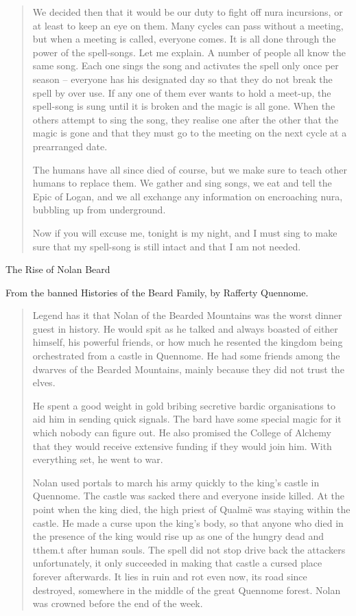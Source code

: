 \begin{multicols}{2}
\begin{quotation}
	We decided then that it would be our duty to fight off nura incursions, or at least to keep an eye on them.  Many cycles can pass without a meeting, but when a meeting is called, everyone comes.  It is all done through the power of the spell-songs.  Let me explain.  A number of people all know the same song.  Each one sings the song and activates the spell only once per season -- everyone has his designated day so that they do not break the spell by over use.  If any one of them ever wants to hold a meet-up, the spell-song is sung until it is broken and the magic is all gone.  When the others attempt to sing the song, they realise one after the other that the magic is gone and that they must go to the meeting on the next cycle at a prearranged date.

	The humans have all since died of course, but we make sure to teach other humans to replace them.  We gather and sing songs, we eat and tell the Epic of Logan, and we all exchange any information on encroaching nura, bubbling up from underground.

	Now if you will excuse me, tonight is my night, and I must sing to make sure that my spell-song is still intact and that I am not needed.

\end{quotation}

The Rise of Nolan Beard

From the banned Histories of the Beard Family, by Rafferty Quennome.

\begin{quotation}

	Legend has it that Nolan of the Bearded Mountains was the worst dinner guest in history.  He would spit as he talked and always boasted of either himself, his powerful friends, or how much he resented the kingdom being orchestrated from a castle in Quennome.  He had some friends among the dwarves of the Bearded Mountains, mainly because they did not trust the elves.

	He spent a good weight in gold bribing secretive bardic organisations to aid him in sending quick signals.  The bard have some special magic for it which nobody can figure out.  He also promised the College of Alchemy that they would receive extensive funding if they would join him.  With everything set, he went to war.

	Nolan used portals to march his army quickly to the king's castle in Quennome.  The castle was sacked there and everyone inside killed.  At the point when the king died, the high priest of Qualm\"{e} was staying within the castle.  He made a curse upon the king's body, so that anyone who died in the presence of the king would rise up as one of the hungry dead and tthem.t after human souls.  The spell did not stop drive back the attackers unfortunately, it only succeeded in making that castle a cursed place forever afterwards.  It lies in ruin and rot even now, its road since destroyed, somewhere in the middle of the great Quennome forest.  Nolan was crowned before the end of the week.


\end{quotation}
\end{multicols}
